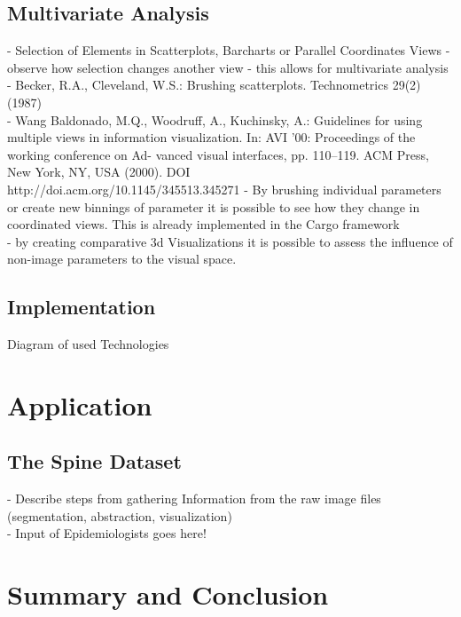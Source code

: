 \documentclass[journal]{style/vgtc}           %
\begin{document}
\subsection{Multivariate Analysis}
- Selection of Elements in Scatterplots, Barcharts or Parallel Coordinates Views - observe how selection changes another view - this allows for multivariate analysis\\
- Becker, R.A., Cleveland, W.S.: Brushing scatterplots. Technometrics 29(2) (1987)\\
- Wang Baldonado, M.Q., Woodruff, A., Kuchinsky, A.: Guidelines for using multiple views in information visualization. In: AVI ’00: Proceedings of the working conference on Ad- vanced visual interfaces, pp. 110–119. ACM Press, New York, NY, USA (2000). DOI\\ http://doi.acm.org/10.1145/345513.345271
- By brushing individual parameters or create new binnings of parameter it is possible to see how they change in coordinated views. This is already implemented in the Cargo framework\\
- by creating comparative 3d Visualizations it is possible to assess the influence of non-image parameters to the visual space.

\subsection{Implementation}
Diagram of used Technologies

\section{Application}

\subsection{The Spine Dataset}
- Describe steps from gathering Information from the raw image files (segmentation, abstraction, visualization)\\
- Input of Epidemiologists goes here!

\section{Summary and Conclusion}





\end{document}
